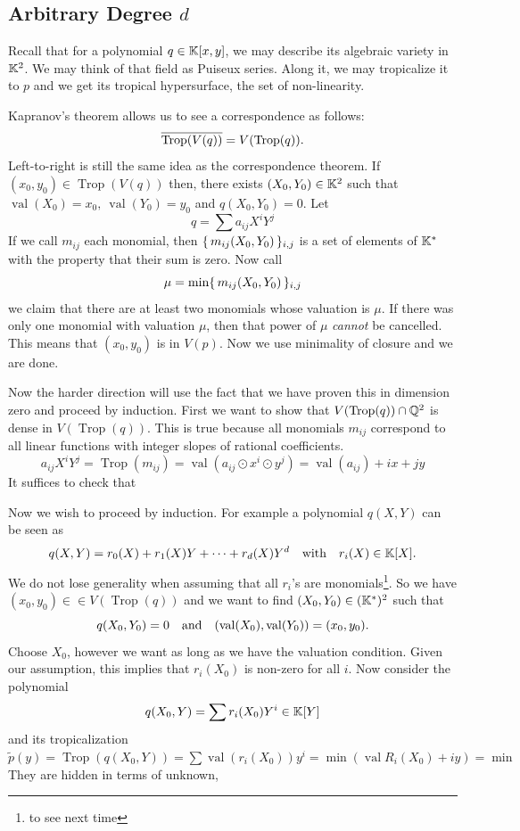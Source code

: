\documentclass[12pt]{memoir}
\DeclareMathOperator{\val}{val}
\DeclareMathOperator{\Trop}{Trop}
\begin{document}
\subsection{Arbitrary Degree $d$}

Recall that for a polynomial $q\in\mathbb{K}[x,y]$, we may describe its algebraic variety in $\mathbb{K}^2$. We may think of that field as Puiseux series. Along it, we may tropicalize it to $p$ and we get its tropical hypersurface, the set of non-linearity.\par
Kapranov's theorem allows us to see a correspondence as follows:
$$\ov{\Trop(V(q))}=V(\Trop(q)).$$
Left-to-right is still the same idea as the correspondence theorem. If $(x_0,y_0)\in\Trop(V(q))$ then, there exists $(X_0,Y_0)\in\mathbb{K}^2$ such that $\val(X_0)=x_0,\ \val(Y_0)=y_0$ and $q(X_0,Y_0)=0$. Let 
$$q=\sum a_{ij}X^iY^j$$
If we call $m_{ij}$ each monomial, then $\{\,m_{ij}(X_0,Y_0)\,\}_{i,j}$ is a set of elements of $\mathbb{K}^\ast$ with the property that their sum is zero. Now call 
$$\mu=\min\{\,m_{ij}(X_0,Y_0)\,\}_{i,j}$$
we claim that there are at least two monomials whose valuation is $\mu$. If there was only one monomial with valuation $\mu$, then that power of $\mu$ \emph{cannot} be cancelled. This means that $(x_0,y_0) $ is in $V(p)$. Now we use minimality of closure and we are done.\par 
Now the harder direction will use the fact that we have proven this in dimension zero and proceed by induction. First we want to show that $V(\Trop(q))\cap\bQ^2$ is dense in $V(\Trop(q))$. This is true because all monomials $m_{ij}$ correspond to all linear functions with integer slopes of rational coefficients.
$$a_{ij}X^iY^j=\Trop(m_{ij})=\val(a_{ij}\odot x^{i}\odot y^j)=\val(a_{ij})+ix+jy$$
It suffices to check that \par 
Now we wish to proceed by induction. For example a polynomial $q(X,Y)$ can be seen as 
$$q(X,Y)=r_0(X)+r_1(X)Y+\dots+r_d(X)Y^d\quad\text{with}\quad r_i(X)\in\mathbb{K}[X].$$
We do not lose generality when assuming that all $r_i$'s are monomials\footnote{to see next time}. So we have $(x_0,y_0)\in\in V(\Trop(q))$ and we want to find $(X_0,Y_0)\in(\mathbb{K}^\ast)^2$ such that 
$$q(X_0,Y_0)=0\word{and}(\val(X_0),\val(Y_0))=(x_0,y_0).$$
Choose $X_0$, however we want as long as we have the valuation condition. Given our assumption, this implies that $r_i(X_0)$ is non-zero for all $i$. Now consider the polynomial 
$$q(X_0,Y)=\sum r_i(X_0)Y^i\in\mathbb{K}[Y]$$
and its tropicalization
$\tilde{p}(y)=\Trop(q(X_0,Y))=\sum\val(r_i(X_0))y^i=\min(\val R_i(X_0)+iy)=\min$
They are hidden in terms of unknown,
\end{document}
